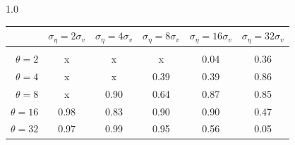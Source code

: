 \documentclass[12pt]{article}
\begin{document}
\begin{table}[h!]
\begin{subtable}{1.0\textwidth}
    \centering
\begin{tabular}{rccccc}
\hline  
            & \multicolumn{1}{l}{$\sigma_{\eta} =2\sigma_{v}$} & \multicolumn{1}{l}{$\sigma_{\eta} =4\sigma_{v}$} & \multicolumn{1}{l}{$\sigma_{\eta} =8\sigma_{v}$} & \multicolumn{1}{l}{$\sigma_{\eta} =16\sigma_{v}$} & \multicolumn{1}{l}{$\sigma_{\eta} =32\sigma_{v}$} \\ \hline  \vspace{-3mm} \\        
$\theta=2$  & x                                                 & x                                                 & x                                                 & 0.04                                               & 0.36                                               \\ \hline
$\theta=4$  & x                                                 & x                                                 & 0.39                                              & 0.39                                               & 0.86                                               \\ \hline
$\theta=8$  & x                                                 & 0.90                                              & 0.64                                              & 0.87                                               & 0.85                                               \\ \hline
$\theta=16$ & 0.98                                              & 0.83                                              & 0.90                                              & 0.90                                               & 0.47                                               \\ \hline
$\theta=32$ & 0.97                                              & 0.99                                              & 0.95                                              & 0.56                                               & 0.05                                               \\ \hline
\end{tabular}
\end{subtable}


\end{table}
\end{document}
